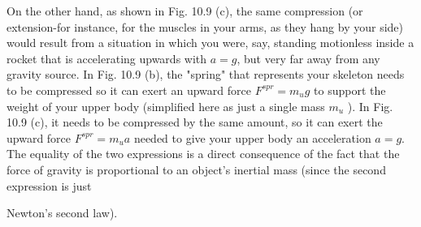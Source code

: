 \documentclass[10pt]{article}
\begin{document}
On the other hand, as shown in Fig. 10.9 (c), the same compression (or extension-for instance, for the muscles in your arms, as they hang by your side) would result from a situation in which you were, say, standing motionless inside a rocket that is accelerating upwards with $a=g$, but very far away from any gravity source. In Fig. 10.9 (b), the "spring" that represents your skeleton needs to be compressed so it can exert an upward force $F^{s p r}=m_{u} g$ to support the weight of your upper body (simplified here as just a single mass $m_{u}$ ). In Fig. 10.9 (c), it needs to be compressed by the same amount, so it can exert the upward force $F^{s p r}=m_{u} a$ needed to give your upper body an acceleration $a=g$. The equality of the two expressions is a direct consequence of the fact that the force of gravity is proportional to an object's inertial mass (since the second expression is just

Newton's second law).
\end{document}
